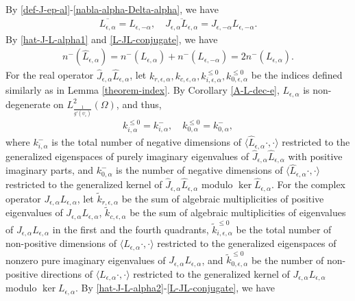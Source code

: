 \documentclass[1 [leqno, 11pt]{amsart}
\numberwithin{equation}{section}
\let\ep=\epsilon
\begin{document}
\begin{CJK*}{GBK}{song}
\begin{align*}
\end{align*}
By \eqref{def-J-ep-al}-\eqref{nabla-alpha-Delta-alpha}, we have
\begin{align}\label{L-JL-conjugate}
\overline{L_{\ep,\alpha}}=L_{\ep,-\alpha},\quad  \overline{J_{\ep,\alpha}L_{\ep,\alpha}}=J_{\ep,-\alpha}L_{\ep,-\alpha}.
\end{align}
By  \eqref{hat-J-L-alpha1} and \eqref{L-JL-conjugate}, we have
\begin{align*}
n^-(\hat L_{\ep,\alpha})=n^-( L_{\ep,\alpha})+n^-( L_{\ep,-\alpha})=2n^-(L_{\ep,\alpha}).
\end{align*}
For the real operator $\hat{J}_{\ep,\alpha}\hat{L}_{\ep,\alpha}$, let $k_{r,\ep,\alpha}, k_{c,\ep,\alpha}, k_{i,\ep,\alpha}^{\leq0}, k_{0,\ep,\alpha}^{\leq0}$ be the indices defined similarly as in Lemma
\ref{theorem-index}.
By Corollary \ref{A-L-dec-e}, $L_{\ep,\alpha}$
is non-degenerate on $L^2_{\frac{1}{g'(\psi_\ep)}}(\Omega)$, and thus,
\begin{align*}
k_{i,\alpha}^{\leq0}=k_{i,\alpha}^{-},\quad k_{0,\alpha}^{\leq0}=k_{0,\alpha}^{-},
\end{align*}
where $k_{i,\alpha}^-$ is the total number of negative dimensions of $\langle \hat{L}_{\ep,\alpha}\cdot, \cdot \rangle$ restricted to the generalized eigenspaces of purely imaginary eigenvalues of $\hat{J}_{\ep,\alpha}\hat{L}_{\ep,\alpha}$ with positive imaginary parts, and $k_{0,\alpha}^-$ is the number of negative dimensions of $\langle \hat{L}_{\ep,\alpha}\cdot, \cdot \rangle$ restricted to the generalized kernel of $\hat{J}_{\ep,\alpha}\hat{L}_{\ep,\alpha}$ modulo $\ker \hat{L}_{\ep,\alpha}$.
\fi
For the complex operator $J_{\ep,\alpha}L_{\ep,\alpha}$,
let $\tilde k_{r,\ep,\alpha}$ be  the sum of algebraic multiplicities of positive eigenvalues of $J_{\ep,\alpha}L_{\ep,\alpha}$,
 $\tilde k_{c,\ep,\alpha}$
be the sum of algebraic multiplicities of eigenvalues of $J_{\ep,\alpha}L_{\ep,\alpha}$ in the first
and the fourth quadrants,
$\tilde k_{i,\ep,\alpha}^{\leq0}$ be  the total number of non-positive dimensions
of $\langle L_{\ep,\alpha}\cdot,\cdot\rangle$  restricted to the  generalized eigenspaces of nonzero
pure imaginary eigenvalues of $J_{\ep,\alpha}L_{\ep,\alpha}$,
  and $\tilde k_{0,\ep,\alpha}^{\leq0}$ be the number of non-positive directions of $\langle L_{\ep,\alpha}\cdot, \cdot \rangle$ restricted to the generalized kernel of $J_{\ep,\alpha}L_{\ep,\alpha}$ modulo $\ker L_{\ep,\alpha}$.
By  \eqref{hat-J-L-alpha2}-\eqref{L-JL-conjugate}, we have
\begin{align}\label{index-k-tilde-k}

\end{align}
\end{CJK*}
\end{document}
